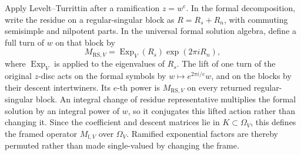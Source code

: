 Apply Levelt--Turrittin after a ramification \(z=w^e\).  In the formal
decomposition, write the residue on a regular-singular block as
\(R=R_s+R_n\), with commuting semisimple and nilpotent parts.  In the
universal formal solution algebra, define a full turn of \(w\) on that block
by
\[
 M_{\mathrm{RS},V}
 =\operatorname{Exp}_V(R_s)\exp(2\pi iR_n),
\]
where \(\operatorname{Exp}_V\) is applied to the eigenvalues of \(R_s\).
The lift of one turn of the original \(z\)-disc acts on the formal symbols by
\(w\mapsto e^{2\pi i/e}w\), and on the blocks by their descent
intertwiners.  Its \(e\)-th power is \(M_{\mathrm{RS},V}\) on every returned
regular-singular block.  An integral change of residue representative
multiplies the formal solution by an integral power of \(w\), so it conjugates
this lifted action rather than changing it.  Since the coefficient and
descent matrices lie in \(K\subset\Omega_V\), this defines the framed
operator \(M_{\mathrm f,V}\) over \(\Omega_V\).  Ramified exponential factors
are thereby permuted rather than made single-valued by changing the frame.

